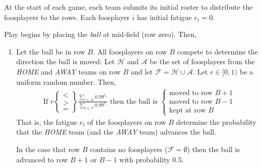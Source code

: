 \documentclass[12pt,letterpaper,twoside]{article}
\newcommand{\FatFactor}{0.99}
\begin{document}
At the start of each game, each team submits its initial roster to distribute the foosplayers to the rows. Each foosplayer $i$ has initial fatigue $e_i = 0$.

Play begins by placing the {\em ball} at mid-field (row zero). Then,
\begin{enumerate}
\item Let the ball be in row $B$. All foosplayers on row $B$ compete to determine the direction the ball is moved: Let $\mathcal{H}$ and $\mathcal{A}$ be the set of foosplayers from the {\em HOME} and {\em AWAY} teams on row $B$ and let $\mathcal{F} = \mathcal{H}\cup \mathcal{A}$. Let $r \in [0,1)$ be a uniform random number. Then,
\begin{align*}
\text{If } r
\begin{Bmatrix}
< \\
> \\
=
\end{Bmatrix}
\frac{\sum_{i\in\mathcal{H}} \FatFactor^{e_i}}{\sum_{i\in\mathcal{F}} \FatFactor^{e_i}} 
\text{ then the ball is }
\begin{cases}
\text{moved to row $B+1$} \\
\text{moved to row $B-1$} \\
\text{kept at row $B$}
\end{cases}
\end{align*}
That is, the fatigue $e_i$ of the foosplayers on row $B$ determine the probability that the {\em HOME} team (and the {\em AWAY} team) advances the ball.

In the case that row $B$ contains no foosplayers ($\mathcal{F} = \emptyset$) then the ball is advanced to row $B+1$ or $B-1$ with probability $0.5$.



\end{enumerate}
\end{document}
